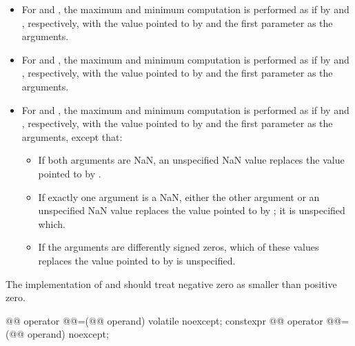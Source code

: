 \begin{itemdescr}
\pnum
\begin{itemize}
\item
For  and ,
the maximum and minimum computation is performed
as if by  and , respectively,
with the value pointed to by  and
the first parameter as the arguments.
\item
For  and ,
the maximum and minimum computation is performed
as if by  and , respectively,
with the value pointed to by  and
the first parameter as the arguments.
\item
For  and ,
the maximum and minimum computation is performed
as if by  and , respectively,
with the value pointed to by  and
the first parameter as the arguments, except that:
\begin{itemize}
\item
If both arguments are NaN,
an unspecified NaN value replaces the value pointed to by .
\item
If exactly one argument is a NaN,
either the other argument or an unspecified NaN value replaces
the value pointed to by ;
it is unspecified which.
\item
If the arguments are differently signed zeros,
which of these values replaces the value pointed to by  is unspecified.
\end{itemize}
\end{itemize}

\pnum
\recommended
The implementation of  and 
should treat negative zero as smaller than positive zero.
\end{itemdescr}

%
%
%
%
\begin{itemdecl}
@@ operator @@=(@@ operand) volatile noexcept;
constexpr @@ operator @@=(@@ operand) noexcept;
\end{itemdecl}

